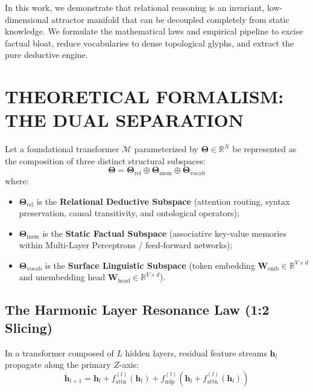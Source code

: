 \documentclass[10pt,twocolumn]{article}
\begin{document}
In this work, we demonstrate that relational reasoning is an invariant, low-dimensional attractor manifold that can be decoupled completely from static knowledge. We formulate the mathematical laws and empirical pipeline to excise factual bloat, reduce vocabularies to dense topological glyphs, and extract the pure deductive engine.



\section{THEORETICAL FORMALISM: THE DUAL SEPARATION}

Let a foundational transformer $\mathcal{M}$ parameterized by $\mathbf{\Theta} \in \mathbb{R}^N$ be represented as the composition of three distinct structural subspaces:
\begin{equation}
  \mathbf{\Theta} = \mathbf{\Theta}_{\text{rel}} \oplus \mathbf{\Theta}_{\text{mem}} \oplus \mathbf{\Theta}_{\text{vocab}}
\end{equation}
where:
\begin{itemize}
  \item $\mathbf{\Theta}_{\text{rel}}$ is the \textbf{Relational Deductive Subspace} (attention routing, syntax preservation, causal transitivity, and ontological operators);
  \item $\mathbf{\Theta}_{\text{mem}}$ is the \textbf{Static Factual Subspace} (associative key-value memories within Multi-Layer Perceptrons / feed-forward networks);
  \item $\mathbf{\Theta}_{\text{vocab}}$ is the \textbf{Surface Linguistic Subspace} (token embedding $\mathbf{W}_{\text{emb}} \in \mathbb{R}^{V \times d}$ and unembedding head $\mathbf{W}_{\text{head}} \in \mathbb{R}^{V \times d}$).
\end{itemize}


\subsection{The Harmonic Layer Resonance Law (1:2 Slicing)}

In a transformer composed of $L$ hidden layers, residual feature streams $\mathbf{h}_l$ propagate along the primary $Z$-axis:
\begin{equation}
  \mathbf{h}_{l+1} = \mathbf{h}_l + f_{\text{attn}}^{(l)}(\mathbf{h}_l) + f_{\text{mlp}}^{(l)}(\mathbf{h}_l + f_{\text{attn}}^{(l)}(\mathbf{h}_l))
\end{equation}
\end{document}
